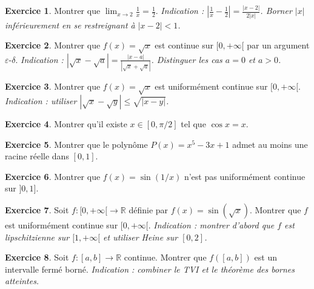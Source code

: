 \documentclass[12pt,a4paper,openany]{book}
\theoremstyle{definition}
\newtheorem{exercice}{Exercice}[chapter]
\newcommand{\R}{\mathbb{R}}
\begin{document}
\begin{exercice}\label{exo:limite-1surx}
Montrer que $\displaystyle\lim_{x \to 2} \frac{1}{x} = \frac{1}{2}$.
\textit{Indication : $\left|\frac{1}{x} - \frac{1}{2}\right| = \frac{|x-2|}{2|x|}$. Borner $|x|$ inférieurement en se restreignant à $|x-2| < 1$.}
\end{exercice}

\begin{exercice}\label{exo:continuite-sqrt}
Montrer que $f(x) = \sqrt{x}$ est continue sur $[0, +\infty[$ par un argument $\varepsilon$-$\delta$.
\textit{Indication : $|\sqrt{x} - \sqrt{a}| = \frac{|x - a|}{|\sqrt{x} + \sqrt{a}|}$. Distinguer les cas $a = 0$ et $a > 0$.}
\end{exercice}

\begin{exercice}\label{exo:sqrt-unif-continue}
Montrer que $f(x) = \sqrt{x}$ est uniformément continue sur $[0, +\infty[$.
\textit{Indication : utiliser $|\sqrt{x} - \sqrt{y}| \leqslant \sqrt{|x-y|}$.}
\end{exercice}

\begin{exercice}\label{exo:TVI-cos}
Montrer qu'il existe $x \in [0, \pi/2]$ tel que $\cos x = x$.
\end{exercice}

\begin{exercice}\label{exo:TVI-polynome}
Montrer que le polynôme $P(x) = x^5 - 3x + 1$ admet au moins une racine réelle dans $[0, 1]$.
\end{exercice}

\begin{exercice}\label{exo:non-unif-sin1x}
Montrer que $f(x) = \sin(1/x)$ n'est pas uniformément continue sur $]0, 1]$.
\end{exercice}

\begin{exercice}\label{exo:lipschitz-sin}
Soit $f \colon [0, +\infty[ \to \R$ définie par $f(x) = \sin(\sqrt{x})$. Montrer que $f$ est uniformément continue sur $[0, +\infty[$. \textit{Indication : montrer d'abord que $f$ est lipschitzienne sur $[1, +\infty[$ et utiliser Heine sur $[0, 2]$.}
\end{exercice}

\begin{exercice}\label{exo:image-intervalle}
Soit $f \colon [a, b] \to \R$ continue. Montrer que $f([a, b])$ est un intervalle fermé borné. \textit{Indication : combiner le TVI et le théorème des bornes atteintes.}
\end{exercice}
\end{document}
